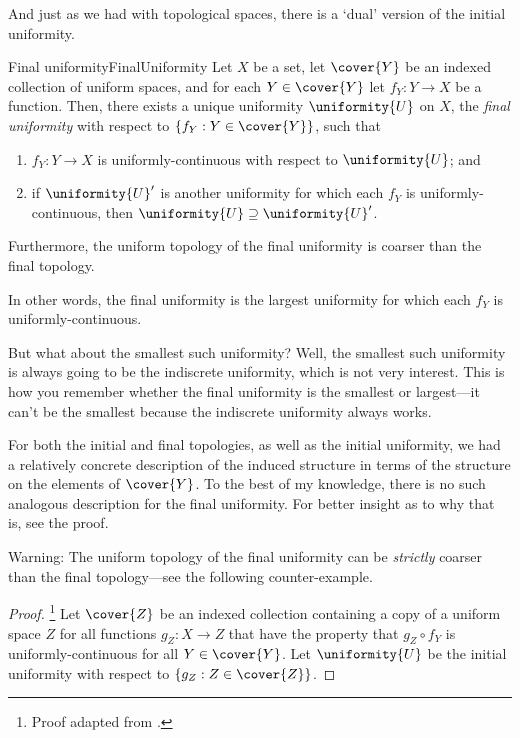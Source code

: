 And just as we had with topological spaces, there is a `dual' version of the initial uniformity.
\begin{prp}{Final uniformity}{FinalUniformity}
Let $X$ be a set, let $\cover{Y}$ be an indexed collection of uniform spaces, and for each $Y\in \cover{Y}$ let $f_Y:Y\rightarrow X$ be a function.  Then, there exists a unique uniformity $\uniformity{U}$ on $X$, the \emph{final uniformity} with respect to $\{ f_Y:Y\in \cover{Y}\}$, such that
\begin{enumerate}
\item $f_Y:Y\rightarrow X$ is uniformly-continuous with respect to $\uniformity{U}$; and
\item if $\uniformity{U}'$ is another uniformity for which each $f_Y$ is uniformly-continuous, then $\uniformity{U}\supseteq \uniformity{U}'$.
\end{enumerate}
Furthermore, the uniform topology of the final uniformity is coarser than the final topology.
\begin{rmk}
In other words, the final uniformity is the largest uniformity for which each $f_Y$ is uniformly-continuous.
\end{rmk}
\begin{rmk}
But what about the smallest such uniformity?  Well, the smallest such uniformity is always going to be the indiscrete uniformity, which is not very interest.  This is how you remember whether the final uniformity is the smallest or largest---it can't be the smallest because the indiscrete uniformity always works.
\end{rmk}
\begin{rmk}
For both the initial and final topologies, as well as the initial uniformity, we had a relatively concrete description of the induced structure in terms of the structure on the elements of $\cover{Y}$.  To the best of my knowledge, there is no such analogous description for the final uniformity.  For better insight as to why that is, see the proof.
\end{rmk}
\begin{wrn}
Warning:  The uniform topology of the final uniformity can be \emph{strictly} coarser than the final topology---see the following counter-example.
\end{wrn}
\begin{proof}\footnote{Proof adapted from \cite[Theorem 1.2.1.1]{Preuss}.}
Let $\cover{Z}$ be an indexed collection containing a copy of a uniform space $Z$ for all functions $g_Z\colon X\rightarrow Z$ that have the property that $g_Z\circ f_Y$ is uniformly-continuous for all $Y\in \cover{Y}$.  Let $\uniformity{U}$ be the initial uniformity with respect to $\{ g_Z:Z\in \cover{Z}\}$.


\end{proof}
\end{prp}
